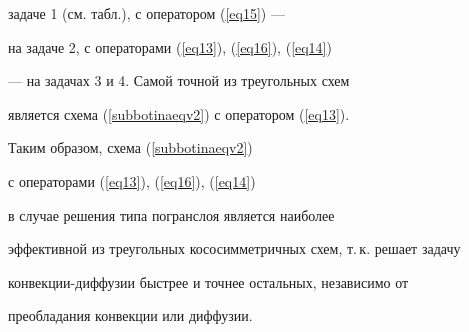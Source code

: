 задаче 1 (см. табл.), с оператором (\ref{eq15}) --- 


на задаче 2, с операторами (\ref{eq13}), (\ref{eq16}), (\ref{eq14})


--- на задачах 3 и 4. Самой точной из треугольных схем


является схема (\ref{subbotinaeqv2}) с оператором (\ref{eq13}).





Таким образом, схема (\ref{subbotinaeqv2})


с операторами (\ref{eq13}), (\ref{eq16}), (\ref{eq14})


в случае решения типа погранслоя является наиболее 


эффективной из треугольных кососимметричных схем, т.\,к. решает задачу 


конвекции-диффузии быстрее и точнее остальных, независимо от 


преобладания конвекции или диффузии.








